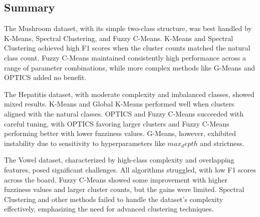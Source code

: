 \subsection{Summary}
\label{subsec:resultssummary}

The Mushroom dataset, with its simple two-class structure, was best handled by K-Means,
Spectral Clustering, and Fuzzy C-Means. K-Means and Spectral Clustering achieved high F1 
scores when the cluster counts matched the natural class count. Fuzzy C-Means maintained
consistently high performance across a range of parameter combinations, while more complex 
methods like G-Means and OPTICS added no benefit.

The Hepatitis dataset, with moderate complexity and imbalanced classes, showed mixed results.
K-Means and Global K-Means performed well when clusters aligned with the natural classes. 
OPTICS and Fuzzy C-Means succeeded with careful tuning, with OPTICS favoring larger clusters and Fuzzy C-Means performing better with lower fuzziness values.
G-Means, however, exhibited instability due to sensitivity to hyperparameters like $max_depth$ and strictness.

The Vowel dataset, characterized by high-class complexity and overlapping 
features, posed significant challenges. All algorithms struggled, with low F1 
scores across the board. Fuzzy C-Means showed some improvement with higher fuzziness 
values and larger cluster counts, but the gains were limited. Spectral Clustering 
and other methods failed to handle the dataset's complexity effectively, emphasizing the need for advanced clustering techniques.